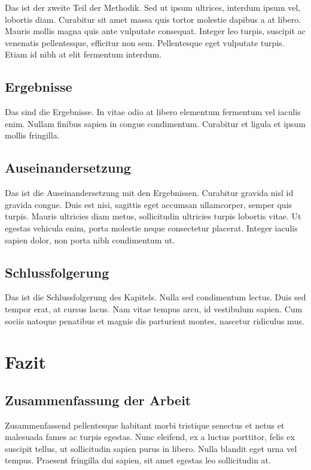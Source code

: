 \documentclass[listof=totoc,index=totoc,bibliography=totoc,12pt,german,a4paper,]{report}
\begin{document}
Das ist der zweite Teil der Methodik. Sed ut ipsum ultrices, interdum
ipsum vel, lobortis diam. Curabitur sit amet massa quis tortor molestie
dapibus a at libero. Mauris mollis magna quis ante vulputate consequat.
Integer leo turpis, suscipit ac venenatis pellentesque, efficitur non
sem. Pellentesque eget vulputate turpis. Etiam id nibh at elit fermentum
interdum.

\section{Ergebnisse}\label{ergebnisse-3}

Das sind die Ergebnisse. In vitae odio at libero elementum fermentum vel
iaculis enim. Nullam finibus sapien in congue condimentum. Curabitur et
ligula et ipsum mollis fringilla.

\section{Auseinandersetzung}\label{auseinandersetzung-3}

Das ist die Auseinandersetzung mit den Ergebnissen. Curabitur gravida
nisl id gravida congue. Duis est nisi, sagittis eget accumsan
ullamcorper, semper quis turpis. Mauris ultricies diam metus,
sollicitudin ultricies turpis lobortis vitae. Ut egestas vehicula enim,
porta molestie neque consectetur placerat. Integer iaculis sapien dolor,
non porta nibh condimentum ut.

\section{Schlussfolgerung}\label{schlussfolgerung-3}

Das ist die Schlussfolgerung des Kapitels. Nulla sed condimentum lectus.
Duis sed tempor erat, at cursus lacus. Nam vitae tempus arcu, id
vestibulum sapien. Cum sociis natoque penatibus et magnis dis parturient
montes, nascetur ridiculus mus.

\chapter{Fazit}\label{sec:conclusion}

\section{Zusammenfassung der Arbeit}\label{zusammenfassung-der-arbeit}

Zusammenfassend pellentesque habitant morbi tristique senectus et netus
et malesuada fames ac turpis egestas. Nunc eleifend, ex a luctus
porttitor, felis ex suscipit tellus, ut sollicitudin sapien purus in
libero. Nulla blandit eget urna vel tempus. Praesent fringilla dui
sapien, sit amet egestas leo sollicitudin at.
\end{document}
